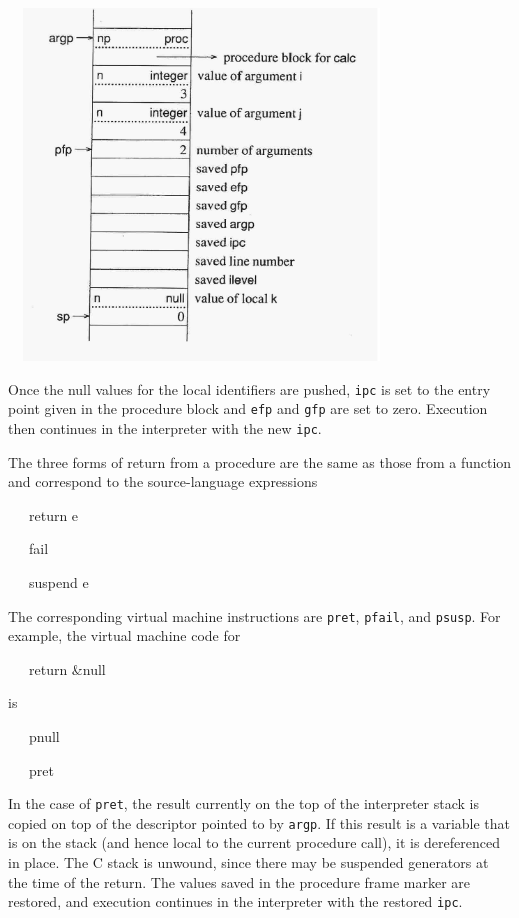 \ \  \includegraphics[width=3.7402in,height=3.6772in]{ib-img/ib-img085.jpg} 


Once the null values for the local identifiers are pushed,
\texttt{ipc} is set to the entry point given in the procedure block
and \texttt{efp} and \texttt{gfp} are set to zero. Execution then
continues in the interpreter with the new \texttt{ipc}.

The three forms of return from a procedure are the same as those from
a function and correspond to the source-language expressions

{\ttfamily\mdseries
\ \ \ return e}

{\ttfamily\mdseries
\ \ \ fail}

{\ttfamily\mdseries
\ \ \ suspend e}


The corresponding virtual machine instructions are \texttt{pret},
\texttt{pfail}, and \texttt{psusp}. For example, the virtual machine
code for

{\ttfamily\mdseries
\ \ \ return \&null}

\noindent is

{\ttfamily\mdseries
\ \ \ pnull}

{\ttfamily\mdseries
\ \ \ pret}


In the case of \texttt{pret}, the result currently on the top of the
interpreter stack is copied on top of the descriptor pointed to by
\texttt{argp}. If this result is a variable that is on the stack (and
hence local to the current procedure call), it is dereferenced in
place. The C stack is unwound, since there may be suspended generators
at the time of the return. The values saved in the procedure frame
marker are restored, and execution continues in the interpreter with
the restored \texttt{ipc}.

